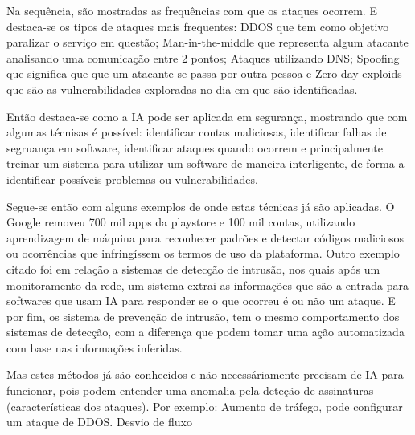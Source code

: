 \documentclass[12pt]{article}
\begin{document}
Na sequência, são mostradas as frequências com que os ataques ocorrem. E destaca-se os tipos de ataques mais frequentes: DDOS que tem como objetivo paralizar o serviço em questão; Man-in-the-middle que representa algum atacante analisando uma comunicação entre 2 pontos; Ataques utilizando DNS; Spoofing que significa que que um atacante se passa por outra pessoa e Zero-day exploids que são as vulnerabilidades exploradas no dia em que são identificadas.

Então destaca-se como a IA pode ser aplicada em segurança, mostrando que com algumas técnisas é possível: identificar contas maliciosas, identificar falhas de segruança em software, identificar ataques quando ocorrem e principalmente treinar um sistema para utilizar um software de maneira interligente, de forma a identificar possíveis problemas ou vulnerabilidades.

Segue-se então com alguns exemplos de onde estas técnicas já são aplicadas. O Google removeu 700 mil apps da playstore e 100 mil contas, utilizando aprendizagem de máquina para reconhecer padrões e detectar códigos maliciosos ou ocorrências que infringíssem os termos de uso da plataforma. Outro exemplo citado foi em relação a sistemas de detecção de intrusão, nos quais após um monitoramento da rede, um sistema extrai as informações que são a entrada para softwares que usam IA para responder se o que ocorreu é ou não um ataque. E por fim, os sistema de prevenção de intrusão, tem o mesmo comportamento dos sistemas de detecção, com a diferença que podem tomar uma ação automatizada com base nas informações inferidas.

Mas estes métodos já são conhecidos e não necessáriamente precisam de IA para funcionar, pois podem entender uma anomalia pela deteção de assinaturas (características dos ataques). Por exemplo: Aumento de tráfego, pode configurar um ataque de DDOS. Desvio de fluxo
\end{document}
